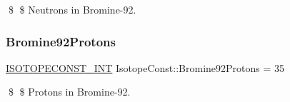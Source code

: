 \$ \$ Neutrons in Bromine-\/92. \mbox{\label{group___isotope_const-_bromine-_br92_gaf3d43ff9d5e256f050353adc1338174f}} 
\subsubsection{\texorpdfstring{Bromine92\+Protons}{Bromine92Protons}}
{\footnotesize\ttfamily \mbox{\hyperlink{group___isotope_const-_macros_ga5f18360b3e99483a35c32d789e62621c}{I\+S\+O\+T\+O\+P\+E\+C\+O\+N\+S\+T\+\_\+\+I\+NT}} Isotope\+Const\+::\+Bromine92\+Protons = 35}

\$ \$ Protons in Bromine-\/92. 